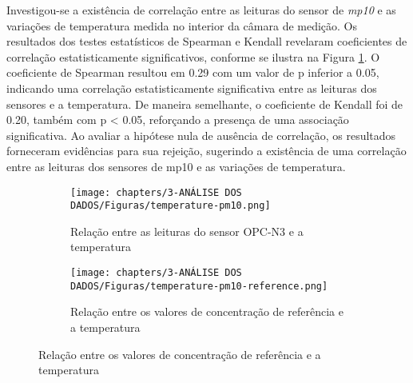 Investigou-se a existência de correlação entre as leituras do sensor de \textit{mp10} e as variações de temperatura medida no interior da câmara de medição. Os resultados dos testes estatísticos de Spearman e Kendall revelaram coeficientes de correlação estatisticamente significativos, conforme se ilustra na Figura \ref{fig:data-temp-pm10-corr}. O coeficiente de Spearman resultou em 0.29 com um valor de p inferior a 0.05, indicando uma correlação estatisticamente significativa entre as leituras dos sensores e a temperatura. De maneira semelhante, o coeficiente de Kendall foi de 0.20, também com p < 0.05, reforçando a presença de uma associação significativa. Ao avaliar a hipótese nula de ausência de correlação, os resultados forneceram evidências para sua rejeição, sugerindo a existência de uma correlação entre as leituras dos sensores de \acrshort{mp10} e as variações de temperatura.

\begin{figure}[h]
    \centering
    
\end{figure}

\begin{figure}[h]
    \centering
    \caption{Relação dos dados de concentração de \acrshort{mp10} com a temperatura}
    \begin{subfigure}{0.4\textwidth}
        \texttt{[image: chapters/3-ANÁLISE DOS DADOS/Figuras/temperature-pm10.png]}
        \caption{Relação entre as leituras do sensor OPC-N3 e a temperatura}
        \label{fig:data-temp-pm10-corr}
    \end{subfigure}
    \hfill
    \begin{subfigure}{0.4\textwidth}
        \texttt{[image: chapters/3-ANÁLISE DOS DADOS/Figuras/temperature-pm10-reference.png]}
        \caption{Relação entre os valores de concentração de referência e a temperatura}
        \label{fig:data-temp-pm10-ref-corr}
    \end{subfigure}
    \hfill
    \label{fig:data-pm10-temp}
\end{figure}


